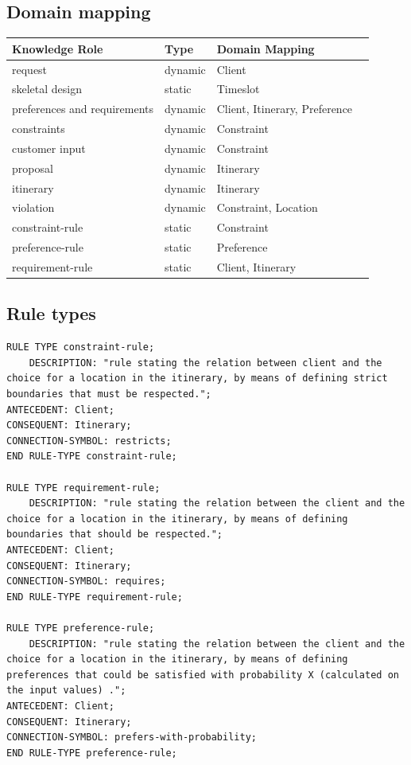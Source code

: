 \documentclass[11pt]{article} %
\begin{document}
\subsection{Domain mapping}
\noindent
\begin{tabularx}{\textwidth}{| X | X | X | X |}
\hline 
\textbf{Knowledge Role} & \textbf{Type} & \textbf{Domain Mapping}
\\ \hline \hline
request    &   dynamic  & Client
\\ \hline
skeletal design  & static    & Timeslot
\\ \hline
preferences and requirements  & dynamic    & Client, Itinerary, Preference
\\ \hline
constraints  & dynamic    & Constraint
\\ \hline
customer input  & dynamic    & Constraint
\\ \hline
proposal  & dynamic    & Itinerary
\\ \hline
itinerary  & dynamic    & Itinerary
\\ \hline
violation  & dynamic    & Constraint, Location %
\\ \hline
constraint-rule  & static    & Constraint
\\ \hline
preference-rule  & static    & Preference
\\ \hline
requirement-rule  & static    & Client, Itinerary
\\ \hline
\end{tabularx}

\subsection{Rule types}\label{sec:rules}

\begin{lstlisting}[label=Rules,caption=Rules,breaklines=true]
RULE TYPE constraint-rule;
    DESCRIPTION: "rule stating the relation between client and the choice for a location in the itinerary, by means of defining strict boundaries that must be respected.";
ANTECEDENT: Client;
CONSEQUENT: Itinerary;
CONNECTION-SYMBOL: restricts;
END RULE-TYPE constraint-rule;

RULE TYPE requirement-rule;
    DESCRIPTION: "rule stating the relation between the client and the choice for a location in the itinerary, by means of defining boundaries that should be respected.";
ANTECEDENT: Client;
CONSEQUENT: Itinerary;
CONNECTION-SYMBOL: requires;
END RULE-TYPE requirement-rule;

RULE TYPE preference-rule;
    DESCRIPTION: "rule stating the relation between the client and the choice for a location in the itinerary, by means of defining preferences that could be satisfied with probability X (calculated on the input values) .";
ANTECEDENT: Client;
CONSEQUENT: Itinerary;
CONNECTION-SYMBOL: prefers-with-probability;
END RULE-TYPE preference-rule;
\end{lstlisting}
\end{document}
